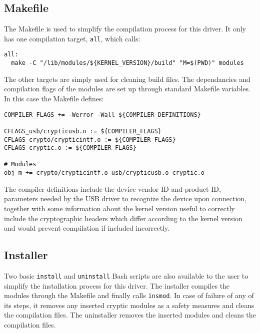 \subsection{Makefile}
The Makefile is used to simplify the compilation process for this driver. It only has one compilation target, \texttt{all}, which calls:
\begin{lstlisting}
all:
  make -C "/lib/modules/${KERNEL_VERSION}/build" "M=$(PWD)" modules
\end{lstlisting}
The other targets are simply used for cleaning build files. The dependancies and compilation flags of the modules are set up through standard Makefile variables. In this case the Makefile defines:
\begin{lstlisting}
COMPILER_FLAGS += -Werror -Wall ${COMPILER_DEFINITIONS}

CFLAGS_usb/crypticusb.o := ${COMPILER_FLAGS}
CFLAGS_crypto/crypticintf.o := ${COMPILER_FLAGS}
CFLAGS_cryptic.o := ${COMPILER_FLAGS}

# Modules
obj-m += crypto/crypticintf.o usb/crypticusb.o cryptic.o
\end{lstlisting}
The compiler definitions include the device vendor ID and product ID, parameters needed by the USB driver to recognize the device upon connection, together with some information about the kernel version useful to correctly include the cryptographic headers which differ according to the kernel version and would prevent compilation if included incorrectly.

\subsection{Installer}
Two basic \texttt{install} and \texttt{uninstall} Bash scripts are also available to the user to simplify the installation process for this driver. The installer compiles the modules through the Makefile and finally calls \texttt{insmod}. In case of failure of any of its steps, it removes any inserted cryptic modules as a safety measures and cleans the compilation files. The uninstaller removes the inserted modules and cleans the compilation files. 
